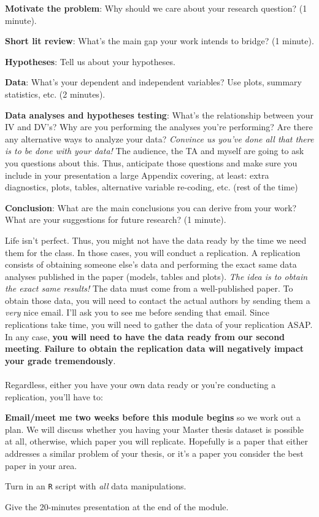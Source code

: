 \documentclass[letterpaper]{article}
\renewenvironment{itemize}{
  \begin{list}{}{
    \setlength{\leftmargin}{1.5em}
  }
}{
  \end{list}
}
\begin{document}
\begin{enumerate}
\begin{itemize}
  \item[$\diamond$] {\bf Motivate the problem}: Why should we care about your research question? (1 minute).
  \item[$\diamond$] {\bf Short lit review}: What's the main gap your work intends to bridge? (1 minute).
  \item[$\diamond$] {\bf Hypotheses}: Tell us about your hypotheses.
  \item[$\diamond$] {\bf Data}: What's your dependent and independent variables? Use plots, summary statistics, etc. (2 minutes).
  \item[$\diamond$] {\bf Data analyses and hypotheses testing}: What's the relationship between your IV and DV's? Why are you performing the analyses you're performing? Are there any alternative ways to analyze your data? \emph{Convince us you've done all that there is to be done with your data!} The audience, the TA and myself are going to ask you questions about this. Thus, anticipate those questions and make sure you include in your presentation a large Appendix covering, at least: extra diagnostics, plots, tables, alternative variable re-coding, etc. (rest of the time)
  \item[$\diamond$] {\bf Conclusion}: What are the main conclusions you can derive from your work? What are your suggestions for future research? (1 minute).
\end{itemize}

Life isn't perfect. Thus, you might not have the data ready by the time we need them for the class. In those cases, you will conduct a replication. A replication consists of obtaining someone else's data and performing the exact same data analyses published in the paper (models, tables and plots). \emph{The idea is to obtain the exact same results!} The data must come from a well-published paper. To obtain those data, you will need to contact the actual authors by sending them a \emph{very} nice email. I'll ask you to see me before sending that email. Since replications take time, you will need to gather the data of your replication ASAP. In any case, {\bf you will need to have the data ready from our second meeting}. {\bf \color{blue}Failure to obtain the replication data will negatively impact your grade tremendously}.
\\
\\
Regardless, either you have your own data ready or you're conducting a replication, you'll have to:

\begin{itemize}
  \item[$\diamond$] {\bf Email/meet me two weeks before this module begins} so we work out a plan. We will discuss whether you having your Master thesis dataset is possible at all, otherwise, which paper you will replicate. Hopefully is a paper that either addresses a similar problem of your thesis, or it's a paper you consider the best paper in your area. 
  \item[$\diamond$] Turn in an \texttt{R} script with \emph{all} data manipulations.
  \item[$\diamond$] Give the 20-minutes presentation at the end of the module.
\end{itemize}


\end{enumerate}
\end{document}
